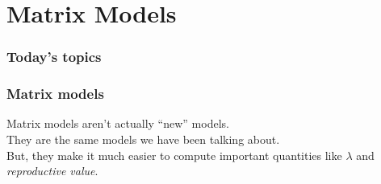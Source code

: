 \documentclass[color=usenames,dvipsnames]{beamer}\usepackage[]{graphicx}\usepackage[]{xcolor}
\begin{document}
















\section{Matrix Models}



\begin{frame}[plain]
  \frametitle{Today's topics}
  \tableofcontents[currentsection]
\end{frame}




\begin{frame}
  \frametitle{Matrix models}
  \Large
  Matrix models aren't actually ``new'' models. \\
  \pause
  \vfill
  They are the same models we have been talking about. \\
  \pause
  \vfill
  But, they make it much easier to compute important
  quantities like $\lambda$ and {\it reproductive value}. \\
\end{frame}
\end{document}
